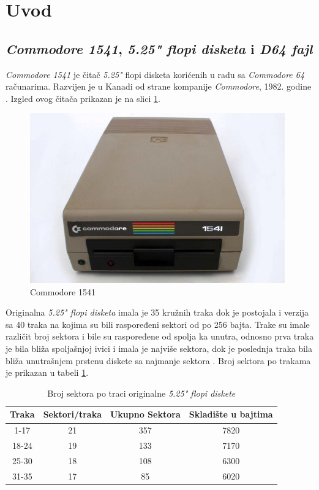 \section{Uvod}

\subsection{\textit{Commodore 1541}, \textit{5.25" flopi disketa} i \textit{D64 fajl}}
\textit{Commodore 1541} je čitač \textit{5.25"} flopi disketa korićenih u radu sa \textit{Commodore 64} računarima. Razvijen je u Kanadi od strane kompanije \textit{Commodore}, 1982. godine \cite{Commodore1541Text}. Izgled ovog čitača prikazan je na slici \ref{img:commodore1541}.
\begin{figure}[ht]
\begin{center}
\includegraphics[width=11cm]{img/Commodore1541.jpg}
\caption[Commodore 1541 \textit{(preuzeto \cite{Commodore1541})}]{Commodore 1541}
\label{img:commodore1541}
\end{center}
\end{figure}

Originalna \textit{5.25" flopi disketa} imala je 35 kružnih traka dok je postojala i verzija sa 40 traka na kojima su bili raspoređeni sektori od po 256 bajta. Trake su imale različit broj sektora i bile su raspoređene od spolja ka unutra, odnosno prva traka je bila bliža spoljašnjoj ivici i imala je najviše sektora, dok je poslednja traka bila bliža unutrašnjem prstenu diskete sa najmanje sektora \cite{D64}. Broj sektora po trakama je prikazan u tabeli \ref{tab:sektor_traka}.
\begin{table}[h!]
\begin{center}
\begin{tabular}{ | c | c| c | c | } 
\hline
Traka & Sektori/traka & Ukupno Sektora & Skladište u bajtima \\
\hline
\hline
1-17 & 21 & 357 & 7820 \\
\hline
18-24 & 19 & 133 & 7170 \\
\hline
25-30 & 18 & 108 & 6300 \\
\hline
31-35 & 17 & 85 & 6020 \\
\hline
\end{tabular}
\end{center}
\caption{Broj sektora po traci originalne \textit{5.25" flopi diskete}}
\label{tab:sektor_traka}
\end{table}

